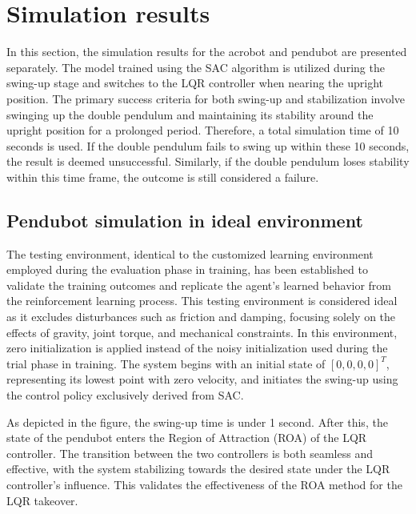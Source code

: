 
\section{Simulation results}
In this section, the simulation results for the acrobot and pendubot are presented separately. The model trained using the SAC algorithm is utilized during the swing-up stage and switches to the LQR controller when nearing the upright position. The primary success criteria for both swing-up and stabilization involve swinging up the double pendulum and maintaining its stability around the upright position for a prolonged period. Therefore, a total simulation time of 10 seconds is used. If the double pendulum fails to swing up within these 10 seconds, the result is deemed unsuccessful. Similarly, if the double pendulum loses stability within this time frame, the outcome is still considered a failure.

\subsection{Pendubot simulation in ideal environment}
The testing environment, identical to the customized learning environment employed during the evaluation phase in training, has been established to validate the training outcomes and replicate the agent's learned behavior from the reinforcement learning process. This testing environment is considered ideal as it excludes disturbances such as friction and damping, focusing solely on the effects of gravity, joint torque, and mechanical constraints. In this environment, zero initialization is applied instead of the noisy initialization used during the trial phase in training. The system begins with an initial state of \([0,0,0,0]^T\), representing its lowest point with zero velocity, and initiates the swing-up using the control policy exclusively derived from SAC.

As depicted in the figure, the swing-up time is under 1 second. After this, the state of the pendubot enters the Region of Attraction (ROA) of the LQR controller. The transition between the two controllers is both seamless and effective, with the system stabilizing towards the desired state under the LQR controller's influence. This validates the effectiveness of the ROA method for the LQR takeover.

